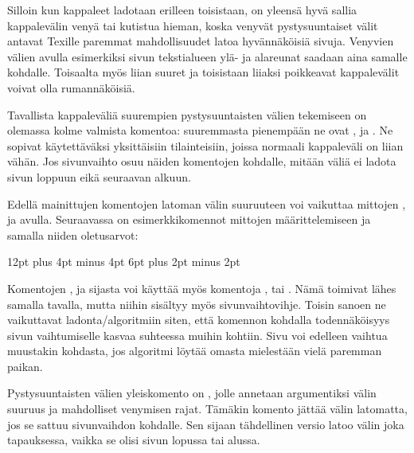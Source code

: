 \begin{koodilohkosis}
\setlength{\parskip}{1.3ex plus .2ex minus .1ex}
\end{koodilohkosis}

Silloin kun kappaleet ladotaan erilleen toisistaan, on yleensä hyvä
sallia kappalevälin venyä tai kutistua hieman, koska venyvät
pystysuuntaiset välit antavat Texille paremmat mahdollisuudet latoa
hyvännäköisiä sivuja. Venyvien välien avulla esimerkiksi sivun
tekstialueen ylä- ja alareunat saadaan aina samalle kohdalle. Toisaalta
myös liian suuret ja toisistaan liiaksi poikkeavat kappalevälit voivat
olla rumannäköisiä.

Tavallista kappaleväliä suurempien pystysuuntaisten välien tekemiseen on
olemassa kolme valmista komentoa: suuremmasta pienempään ne ovat
,  ja . Ne
sopivat käytettäväksi yksittäisiin tilainteisiin, joissa normaali
kappaleväli on liian vähän. Jos sivunvaihto osuu näiden komentojen
kohdalle, mitään väliä ei ladota sivun loppuun eikä seuraavan alkuun.

Edellä mainittujen komentojen latoman välin suuruuteen voi vaikuttaa
mittojen ,  ja
 avulla. Seuraavassa on esimerkkikomennot
mittojen määrittelemiseen ja samalla niiden oletusarvot:

\begin{koodilohkosis}
\setlength{\bigskipamount} {12pt plus 4pt minus 4pt}
\setlength{\medskipamount}  {6pt plus 2pt minus 2pt}
\setlength{\smallskipamount}{3pt plus 1pt minus 1pt}
\end{koodilohkosis}

Komentojen ,  ja 
sijasta voi käyttää myös komentoja ,
 tai . Nämä toimivat lähes
samalla tavalla, mutta niihin sisältyy myös sivunvaihtovihje. Toisin
sanoen ne vaikuttavat ladonta\-/algoritmiin siten, että komennon
kohdalla todennäköisyys sivun vaihtumiselle kasvaa suhteessa muihin
kohtiin. Sivu voi edelleen vaihtua muustakin kohdasta, jos algoritmi
löytää omasta mielestään vielä paremman paikan.

Pystysuuntaisten välien yleiskomento on , jolle
annetaan argumentiksi välin suuruus ja mahdolliset venymisen rajat.
Tämäkin komento jättää välin latomatta, jos se sattuu sivunvaihdon
kohdalle. Sen sijaan tähdellinen versio  latoo välin
joka tapauksessa, vaikka se olisi sivun lopussa tai alussa.

